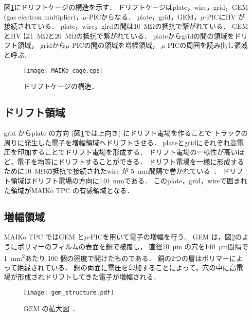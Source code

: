 \documentclass[../master]{subfiles}
\begin{document}
図\ref{fig::MAIKo_cage}にドリフトケージの構造を示す．
ドリフトケージはplate，wire，grid，GEM (gas electron multiplier)，$\mu$-PICからなる．
plate，grid，GEM，$\mu$-PICにHV が接続されている．
plate，wire，girdの間は\SI{10}{\mega\ohm}の抵抗で繋がれている．
GEM とHV は\SI{1}{\mega\ohm}と\SI{20}{\mega\ohm}の抵抗で繋がれている．
plateからgridの間の領域をドリフト領域，
gridから$\mu$-PICの間の領域を増幅領域，
$\mu$-PICの周囲を読み出し領域と呼ぶ．
\begin{figure}
  \centering
  \texttt{[image: MAIKo\_cage.eps]}
  \caption{ドリフトケージの構造．}
  \label{fig::MAIKo_cage}
\end{figure}


\subsection{ドリフト領域}
grid からplate の方向 (図\ref{fig::MAIKo_cage}では上向き) にドリフト電場を作ることで
トラックの周りに発生した電子を増幅領域へドリフトさせる．
plateとgridにそれぞれ高電圧を印加することでドリフト電場を形成する．
ドリフト電場の一様性が高いほど，電子を均等にドリフトすることができる．
ドリフト電場を一様に形成するために\SI{10}{\mega\ohm}の抵抗で接続されたwire が
\SI{5}{\milli\metre}間隔で巻かれている~\cite{furuno}．
ドリフト領域はドリフト電場の方向に\SI{140}{\milli\metre}である．
このplate，grid，wireで囲まれた領域がMAIKo TPC の有感領域となる．

\subsection{増幅領域}
MAIKo TPC ではGEM と$\mu$-PICを用いて電子の増幅を行う．
GEM は，図\ref{pic::GEM}のようにポリマーのフィルムの表面を銅で被覆し，
直径\SI{70}{\micro\metre} の穴を\SI{140}{\micro\metre}間隔で\SI{1}{\square\milli\metre}あたり
100 個の密度で開けたものである．
銅の2つの層はポリマーによって絶縁されている．
銅の両面に電圧を印加することによって，穴の中に高電場が形成されドリフトしてきた電子が増幅される．
\begin{figure}
  \centering
  \texttt{[image: gem\_structure.pdf]}
  \caption{GEM の拡大図~\cite{gem_compass}．}
  \label{pic::GEM}  
\end{figure}
\end{document}
